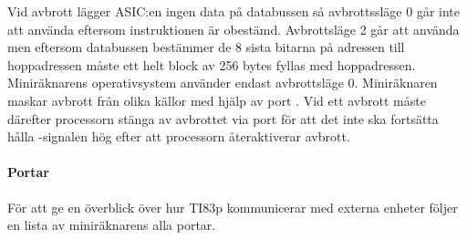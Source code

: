 \documentclass[main.tex]{subfiles}
\begin{document}
Vid avbrott lägger ASIC:en ingen data på databussen så avbrottssläge 0 går inte
att använda eftersom instruktionen är obestämd. Avbrottsläge 2 går att använda
men eftersom databussen bestämmer de 8 sista bitarna på adressen till
hoppadressen måste ett helt block av 256 bytes fyllas med hoppadressen.
Miniräknarens operativsystem använder endast avbrottsläge 0. Miniräknaren
maskar avbrott från olika källor med hjälp av port . Vid ett avbrott
måste därefter processorn stänga av avbrottet via port  för att det
inte ska fortsätta hålla -signalen hög efter att processorn
återaktiverar avbrott.


\paragraph{Portar}
För att ge en överblick över hur TI83p kommunicerar med externa enheter följer
en lista av miniräknarens alla portar.
\end{document}
